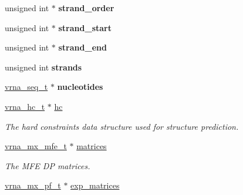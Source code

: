 \begin{Indent}
\begin{DoxyCompactItemize}
unsigned int $\ast$ {\bfseries strand\+\_\+order}
\item 
\mbox{\label{group__fold__compound_a571ee9a932f633c7d9167ae029573935}} 
unsigned int $\ast$ {\bfseries strand\+\_\+start}
\item 
\mbox{\label{group__fold__compound_aaa1b51bc6eb47cc661fea834d7175a54}} 
unsigned int $\ast$ {\bfseries strand\+\_\+end}
\item 
\mbox{\label{group__fold__compound_ad8962b97f5e5e233d9bfb5b16a691d26}} 
unsigned int {\bfseries strands}
\item 
\mbox{\label{group__fold__compound_a855b503aefd052430bf463d8518d2ff5}} 
\hyperlink{sequence_8h_aa35bee3061759495467070b47d0e1f22}{vrna\+\_\+seq\+\_\+t} $\ast$ {\bfseries nucleotides}
\item 
\mbox{\label{group__fold__compound_aceaa904dbf50092d403ca99422e8f824}} 
\hyperlink{group__hard__constraints_gac7e4c4f8abe3163a68110c5bff24e01d}{vrna\+\_\+hc\+\_\+t} $\ast$ \hyperlink{group__fold__compound_aceaa904dbf50092d403ca99422e8f824}{hc}
\begin{DoxyCompactList}\small\item\em The hard constraints data structure used for structure prediction. \end{DoxyCompactList}\item 
\mbox{\label{group__fold__compound_aca8be7bdc65bafe2172c6ee777f18568}} 
\hyperlink{group__dp__matrices_gae5aef35d016475e758f619b7bcb534f9}{vrna\+\_\+mx\+\_\+mfe\+\_\+t} $\ast$ \hyperlink{group__fold__compound_aca8be7bdc65bafe2172c6ee777f18568}{matrices}
\begin{DoxyCompactList}\small\item\em The M\+FE DP matrices. \end{DoxyCompactList}\item 
\mbox{\label{group__fold__compound_afc38ed5a1028a2712d2365274bf49727}} 
\hyperlink{group__dp__matrices_ga68729ab3fed26bdd1806fa814f172fc1}{vrna\+\_\+mx\+\_\+pf\+\_\+t} $\ast$ \hyperlink{group__fold__compound_afc38ed5a1028a2712d2365274bf49727}{exp\+\_\+matrices}

\end{DoxyCompactItemize}
\end{Indent}
